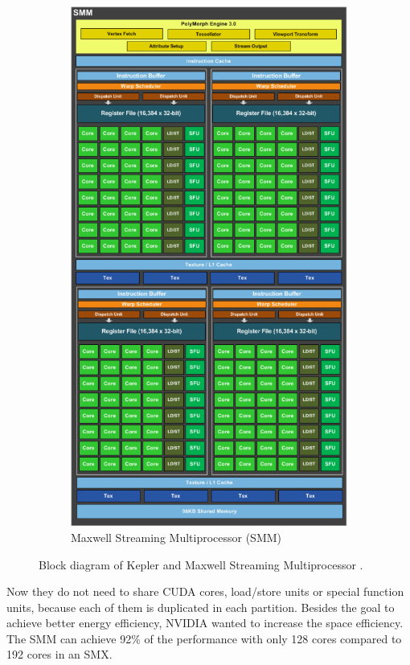 \documentclass[american, hauptseminar, twoside]{zihpub}
\begin{document}
\begin{figure}[h]
\begin{subfigure}[b]{0.4347\textwidth}
					\includegraphics[width=\textwidth]{grafiken/maxwell}
					\caption{Maxwell Streaming Multiprocessor (SMM)}
				\end{subfigure}
				\caption{Block diagram of Kepler and Maxwell Streaming Multiprocessor \cite{Smith2014}.}
				\label{fig:smx}
			\end{figure}Now they do not need to share CUDA cores, load/store units or special function units, because each of them is duplicated in each partition. Besides the goal to achieve better energy efficiency, NVIDIA wanted to increase the space efficiency. The SMM can achieve 92\% of the performance with only 128 cores compared to 192 cores in an SMX.   \cite{Harris2014}\cite{Smith2014}
			
\end{document}
